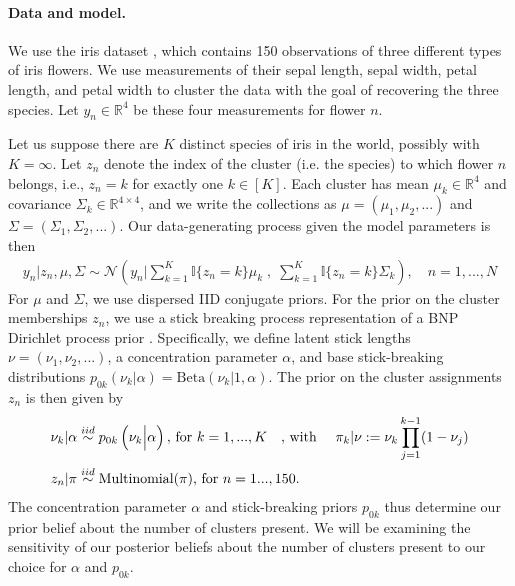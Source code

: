 \paragraph{Data and model.}
We use the iris dataset \citep{iris_data_anderson, iris_data_fisher}, which
contains 150 observations of three different types of iris flowers. We use
measurements of their sepal length, sepal width, petal length, and petal width
to cluster the data with the goal of recovering the three species. Let $y_{n}\in
\mathbb{R}^4$ be these four measurements for flower $n$.

Let us suppose there are $K$ distinct species of iris in the world, possibly
with $K=\infty$. Let $z_n$ denote the index of the cluster (i.e. the species) to
which flower $n$ belongs, i.e., $z_n = k$ for exactly one $k\in [K]$. Each
cluster has mean $\mu_k\in \mathbb{R}^4$ and covariance $\Sigma_k \in
\mathbb{R}^{4\times 4}$, and we write the collections as $\mu = \left(\mu_1,
\mu_2, ...\right)$ and $\Sigma = \left(\Sigma_1, \Sigma_2, ... \right)$. Our
data-generating process given the model parameters is then
%
\begin{align*}
	y_n | z_n, \mu, \Sigma \sim
        \mathcal{N}\left(
            y_n \Big\vert
                \sum_{k=1}^K \mathbb{I}\{z_n = k\} \mu_k \;,
              \; \sum_{k=1}^K \mathbb{I}\{z_n = k\} \Sigma_k\right),
	\quad n = 1, ..., N
\end{align*}
%
For $\mu$ and $\Sigma$, we use dispersed IID conjugate priors.
%
%
For the prior on the cluster memberships $z_n$, we use a stick breaking
process representation of a BNP Dirichlet process prior
\citep{ferguson:1973:bayesian, sethuraman:1994:constructivedp}. Specifically, we
define latent stick lengths $\nu=\left(\nu_1, \nu_2, ...\right)$, a
concentration parameter $\alpha$, and base stick-breaking distributions
$p_{0k}\left(\nu_k \vert \alpha \right) = \mathrm{Beta}\left(\nu_k \Big\vert 1,
\alpha \right)$.  The prior on the cluster assignments $z_n$ is then given by
%
\begin{align}
\nu_k \vert \alpha &\stackrel{iid}{\sim}
    p_{0k}\left(\nu_k \Big\vert \alpha\right)\textrm{, for }k=1,...,K
    \quad\textrm{, with }\quad \nonumber
\pi_k | \nu := \nu_k \prod_{j=1}^{k-1} (1 - \nu_j) \label{eq:stick_breaking} \\
z_n \vert \pi &\stackrel{iid}{\sim} \mathrm{Multinomial}(\pi)\textrm{, for }n = 1...,150.
\end{align}
%
The concentration parameter $\alpha$ and stick-breaking priors $p_{0k}$
thus determine our prior belief about the number of clusters present.
We will be examining the sensitivity of our posterior beliefs about the
number of clusters present to our choice for $\alpha$ and $p_{0k}$.

